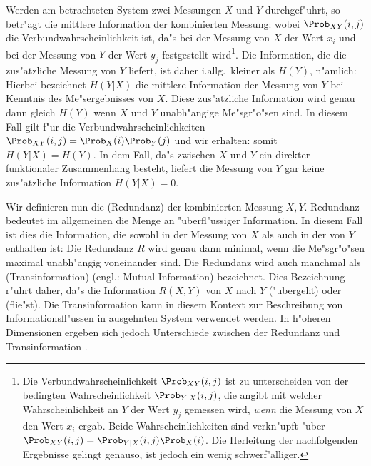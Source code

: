 Werden am betrachteten System zwei Messungen $X$ und $Y$ durchgef"uhrt, so betr"agt die
mittlere Information der kombinierten Messung:
wobei $\Prob_{XY}(i,j)$ die Verbundwahrscheinlichkeit ist, da"s bei der
Messung von $X$ der Wert $x_i$ und bei der Messung von $Y$ der Wert $y_j$ festgestellt
wird\footnote{Die Verbundwahrscheinlichkeit $\Prob_{XY}(i,j)$ ist zu unterscheiden von der
  bedingten Wahrscheinlichkeit $\Prob_{Y|X}(i,j)$, die angibt mit welcher
  Wahrscheinlichkeit an $Y$ der Wert $y_j$ gemessen wird, \emph{wenn} die Messung von $X$
  den Wert $x_i$ ergab. Beide Wahrscheinlichkeiten sind verkn"upft "uber
  $\Prob_{XY}(i,j)=\Prob_{Y|X}(i,j)\Prob_X(i)$. Die Herleitung der nachfolgenden
  Ergebnisse gelingt genauso, ist jedoch ein wenig schwerf"alliger.}.  Die Information,
die die zus"atzliche Messung von $Y$ liefert, ist daher i.allg.\  kleiner als $H(Y)$,
n"amlich:
Hierbei bezeichnet $H(Y|X)$ die mittlere Information der
Messung von $Y$ bei Kenntnis des Me"sergebnisses von $X$. Diese zus"atzliche Information
wird genau dann gleich $H(Y)$ wenn $X$ und $Y$ unabh"angige Me"sgr"o"sen sind. In diesem
Fall gilt f"ur die Verbundwahrscheinlichkeiten $\Prob_{XY}(i,j)=\Prob_X(i)\Prob_Y(j)$ und
wir erhalten:
 somit $H(Y|X)=H(Y)$. In dem Fall, da"s zwischen $X$ und $Y$ ein direkter
funktionaler Zusammenhang besteht, liefert die Messung von $Y$ gar keine zus"atzliche
Information $H(Y|X)=0$.

Wir definieren nun die \begriff(Redundanz) der kombinierten Messung $X,Y$. Redundanz
bedeutet im allgemeinen die Menge an "uberfl"ussiger Information. In diesem Fall ist dies die
Information, die sowohl in der Messung von $X$ als auch in der von $Y$ enthalten ist:
 Die Redundanz $R$ wird genau dann minimal,
wenn die Me"sgr"o"sen maximal unabh"angig voneinander sind. Die Redundanz wird auch
manchmal als \begriff(Transinformation) (engl.: Mutual Information) bezeichnet. Dies
Bezeichnung r"uhrt daher, da"s die Information $R(X,Y)$ von $X$ nach $Y$ \slang("ubergeht)
oder \slang(flie"st). Die Transinformation kann in diesem Kontext zur Beschreibung von
Informationsfl"ussen in ausgehnten System verwendet werden\cite{Pawelzik91}.  In h"oheren
Dimensionen ergeben sich jedoch Unterschiede zwischen der Redundanz und Transinformation
\cite{Prichard95}.



